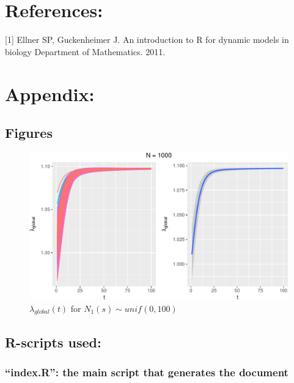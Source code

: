 \documentclass[a4paperpaper,]{article}
\begin{document}
\section{References:}\label{references}

\hypertarget{refs}{}
\hypertarget{ref-Ellner2011}{}
{[}1{]} Ellner SP, Guckenheimer J. An introduction to R for dynamic
models in biology Department of Mathematics. 2011.

\section{Appendix:}\label{appendix}

\subsection{Figures}\label{figures}

\begin{figure}
\centering
\includegraphics{index_files/figure-latex/vis__N1-1.pdf}
\caption{\label{fig:vis__N1} \(\lambda_{global}(t)\) for
\(N_1(s)\sim unif(0,100)\)}
\end{figure}

\subsection{R-scripts used:}\label{r-scripts-used}

\subsubsection{\texorpdfstring{``index.R'': the main script that
generates the
document}{index.R: the main script that generates the document}}\label{index.r-the-main-script-that-generates-the-document}
\end{document}
